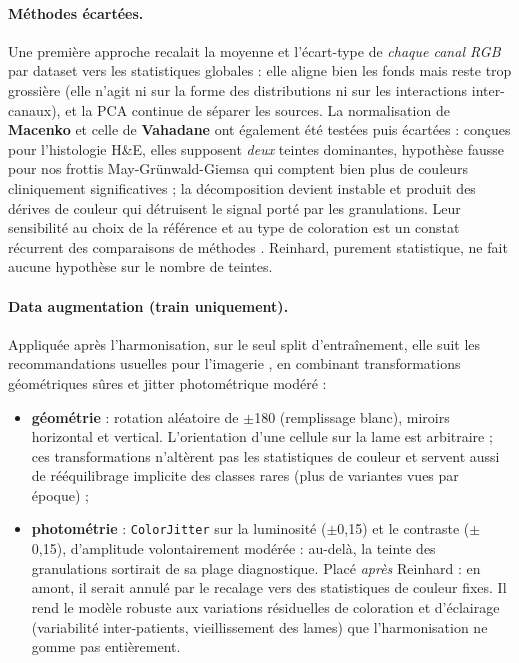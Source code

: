 \paragraph{Méthodes écartées.} Une première approche recalait la moyenne et l’écart-type de \emph{chaque canal RGB} par dataset vers les statistiques globales : elle aligne bien les fonds mais reste trop grossière (elle n’agit ni sur la forme des distributions ni sur les interactions inter-canaux), et la PCA continue de séparer les sources.
La normalisation de \textbf{Macenko} \parencite{macenko2009normalizing} et celle de \textbf{Vahadane} \parencite{vahadane2016structurepreserving} ont également été testées puis écartées : conçues pour l’histologie H\&E, elles supposent \emph{deux} teintes dominantes, hypothèse fausse pour nos frottis May-Grünwald-Giemsa qui comptent bien plus de couleurs cliniquement significatives ; la décomposition devient instable et produit des dérives de couleur qui détruisent le signal porté par les granulations.
Leur sensibilité au choix de la référence et au type de coloration est un constat récurrent des comparaisons de méthodes \parencite{roy2018colornorm}.
Reinhard, purement statistique, ne fait aucune hypothèse sur le nombre de teintes.

\paragraph{Data augmentation (train uniquement).} Appliquée après l’harmonisation, sur le seul split d’entraînement, elle suit les recommandations usuelles pour l’imagerie \parencite{shorten2019survey}, en combinant transformations géométriques sûres et jitter photométrique modéré :

\begin{itemize}
  \item \textbf{géométrie} : rotation aléatoire de $\pm$180\textdegree{} (remplissage blanc), miroirs horizontal et vertical.
L’orientation d’une cellule sur la lame est arbitraire ; ces transformations n’altèrent pas les statistiques de couleur et servent aussi de rééquilibrage implicite des classes rares (plus de variantes vues par époque) ;
  \item \textbf{photométrie} : \texttt{ColorJitter} sur la luminosité ($\pm$0,15) et le contraste ($\pm$0,15), d’amplitude volontairement modérée : au-delà, la teinte des granulations sortirait de sa plage diagnostique.
Placé \emph{après} Reinhard : en amont, il serait annulé par le recalage vers des statistiques de couleur fixes.
Il rend le modèle robuste aux variations résiduelles de coloration et d’éclairage (variabilité inter-patients, vieillissement des lames) que l’harmonisation ne gomme pas entièrement.
\end{itemize}

